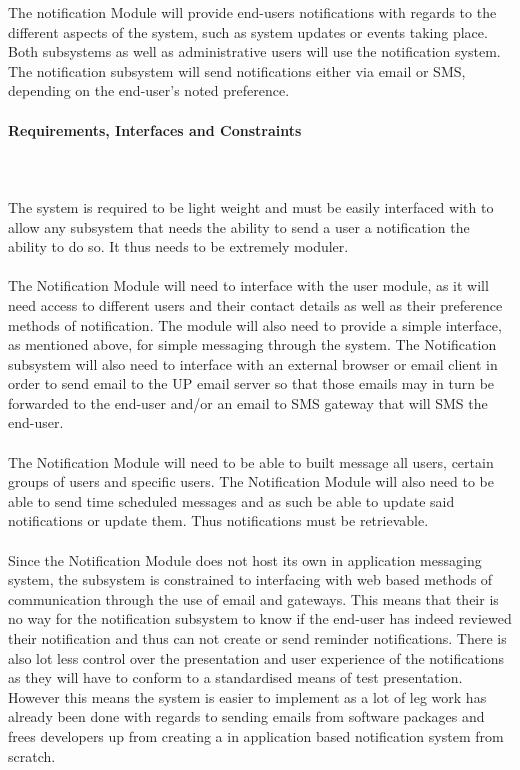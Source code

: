 \documentclass{article}
\begin{document}
				{The notification Module will provide end-users notifications with regards to the different aspects of the system, such as system updates or events taking place. Both subsystems as well as administrative users will use the notification system. The notification subsystem will send notifications either via email or SMS, depending on the end-user's noted preference.}		
		
			\newpage
			\paragraph	{Requirements, Interfaces and Constraints} \mbox{} \\\\
			{The system is required to be light weight and must be easily interfaced with to allow any subsystem that needs the ability to send a user a notification the ability to do so. It thus needs to be extremely moduler. \\ \\The Notification Module will need to interface with the user module, as it will need access to different users and their contact details as well as their preference methods of notification. The module will also need to provide a simple interface, as mentioned above, for simple messaging through the system. The Notification subsystem will also need to interface with an external browser or email client in order to send email to the UP email server so that those emails may in turn be forwarded to the end-user and/or an email to SMS gateway that will SMS the end-user.\\ \\The Notification Module will need to be able to built message all users, certain groups of users and specific users. The Notification Module will also need to be able to send time scheduled messages and as such be able to update said notifications or update them. Thus notifications must be retrievable.\\ \\Since the Notification Module does not host its own in application messaging system, the subsystem is constrained to interfacing with web based methods of communication through the use of email and gateways. This means that their is no way for the notification subsystem to know if the end-user has indeed reviewed their notification and thus can not create or send reminder notifications. There is also lot less control over the presentation and user experience of the notifications as they will have to conform to a standardised means of test presentation. However this means the system is easier to implement as a lot of leg work has already been done with regards to sending emails from software packages and frees developers up from creating a in application based notification system from scratch.}
		
\end{document}
